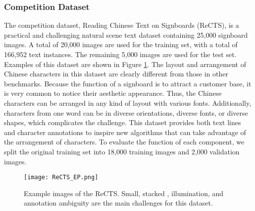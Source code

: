 \subsubsection{Competition Dataset}
\label{subsubsec:rects_cd}
The competition dataset, Reading Chinese Text on Signboards (ReCTS), is a practical and challenging \multioriented natural scene text dataset containing 25,000 signboard images. A total of 20,000 images are used for the training set, with a total of 166,952 text instances. The remaining 5,000 images are used for the test set. Examples of this dataset are shown in Figure \ref{fig:ReCTS}. The layout and arrangement of Chinese characters in this dataset are clearly different from those in other benchmarks. Because the function of a signboard is to attract a customer base, it is very common to notice their aesthetic appearance. Thus, the Chinese characters can be arranged in any kind of layout with various fonts. Additionally, characters from one word can be in diverse orientations, diverse fonts, or diverse shapes, which complicates the challenge. This dataset provides both text lines and character annotations to inspire new algorithms that can take advantage of the arrangement of characters. To evaluate the function of each component, we split the original training set into 18,000 training images and 2,000 validation images.
\begin{figure}[!t]
  \centering
  \centerline{\texttt{[image: ReCTS\_EP.png]}}
  \caption{Example images of the ReCTS. Small, stacked \multioriented, illumination, and annotation ambiguity are the main challenges for this dataset. }\label{fig:ReCTS}
\end{figure}


